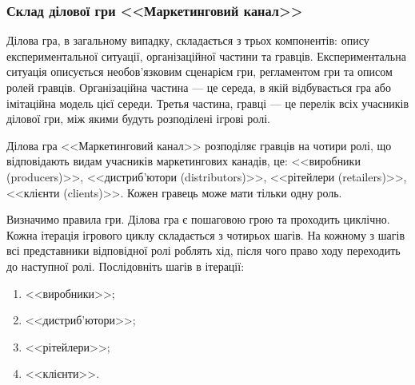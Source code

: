 \subsubsection{Склад ділової гри <<Маркетинговий канал>>}
Ділова гра, в загальному випадку, складається з трьох компонентів: опису експериментальної ситуації, організаційної частини та гравців. Експериментальна ситуація описується необов’язковим сценарієм гри, регламентом гри та описом ролей гравців. Організаційна частина --- це середа, в якій відбувається гра або імітаційна модель цієї середи. Третья частина, гравці --- це перелік всіх учасників ділової гри, між якими будуть розподілені ігрові ролі.

Ділова гра <<Маркетинговий канал>> розподіляє гравців на чотири ролі, що відповідають видам учасників маркетингових канадів, це: <<виробники (producers)>>, <<дистриб’ютори (distributors)>>, <<рітейлери (retailers)>>, <<клієнти (clients)>>. Кожен гравець може мати тільки одну роль.

Визначимо правила гри. Ділова гра є пошаговою грою та проходить циклічно. Кожна ітерація ігрового циклу складається з чотирьох шагів. На кожному з шагів всі представники відповідної ролі роблять хід, після чого право ходу переходить до наступної ролі. Послідовніть шагів в ітерації:
\begin{enumerate}
\item <<виробники>>;
\item <<дистриб’ютори>>;
\item <<рітейлери>>;
\item <<клієнти>>.
\end{enumerate}

